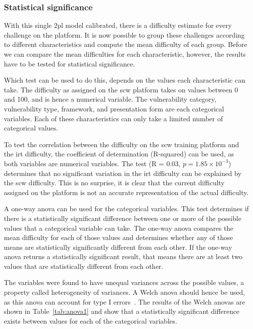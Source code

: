 \subsubsection{Statistical significance}
With this single \gls{2pl} model calibrated, there is a difficulty estimate for every challenge on the platform.
It is now possible to group these challenges according to different characteristics and compute the mean difficulty of each group.
Before we can compare the mean difficulties for each characteristic, however, the results have to be tested for statistical significance.

Which test can be used to do this, depends on the values each characteristic can take.
The difficulty as assigned on the \gls{scw} platform takes on values between 0 and 100, and is hence a numerical variable.
The vulnerability category, vulnerability type, framework, and presentation form are each categorical variables.
Each of these characteristics can only take a limited number of categorical values.

To test the correlation between the difficulty on the \gls{scw} training platform and the \gls{irt} difficulty, the coefficient of determination (R-squared) can be used, as both variables are numerical variables.
The test (R = 0.03, $p = 1.85 \times 10^{-3}$) determines that no significant variation in the \gls{irt} difficulty can be explained by the \gls{scw} difficulty.
This is no surprise, it is clear that the current difficulty assigned on the platform is not an accurate representation of the actual difficulty.

A one-way \gls{anova} can be used for the categorical variables.
This test determines if there is a statistically significant difference between one or more of the possible values that a categorical variable can take.
The one-way \gls{anova} compares the mean difficulty for each of those values and determines whether any of those means are statistically significantly different from each other.
If the one-way \gls{anova} returns a statistically significant result, that means there are at least two values that are statistically different from each other.

The variables were found to have unequal variances across the possible values, a property called heterogeneity of variances.
A Welch \gls{anova} should hence be used, as this \gls{anova} can account for type I errors~\cite{liu2015comparing}.
The results of the Welch \glspl{anova} are shown in Table~\ref{tab:anova1} and show that a statistically significant difference exists between values for each of the categorical variables.

